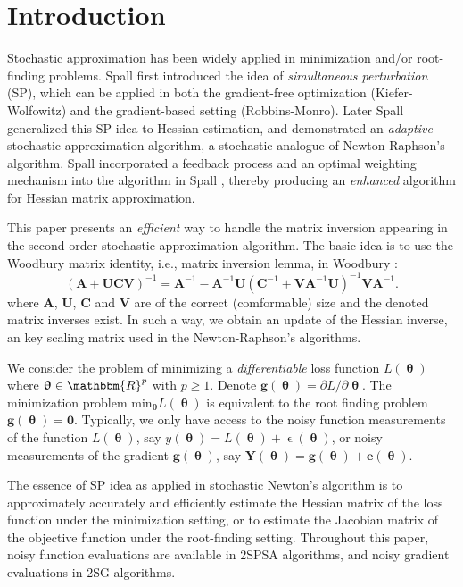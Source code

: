 \documentclass[conference]{IEEEtran}
\begin{document}
	\section{Introduction} \label{Introduction}
	Stochastic approximation has been widely applied in minimization and/or root-finding problems. Spall \cite{Spall1992} first introduced the idea of \textit{simultaneous perturbation} (SP), which can be applied in both the gradient-free optimization (Kiefer-Wolfowitz) and the gradient-based setting (Robbins-Monro). Later Spall \cite{Spall2000} generalized this SP idea to Hessian estimation, and demonstrated an \textit{adaptive} stochastic approximation algorithm, a stochastic analogue of Newton-Raphson's algorithm. Spall \cite{Spall2009} incorporated a feedback process and an optimal weighting mechanism into the algorithm in Spall \cite{Spall2000}, thereby producing an \textit{enhanced} algorithm for Hessian matrix approximation. 
	
	This paper presents an \textit{efficient} way to handle the matrix inversion appearing in the second-order stochastic approximation algorithm. The basic idea is to use the Woodbury matrix identity, i.e., matrix inversion lemma, in Woodbury \cite{Woodbury1950}:
	\begin{equation} \label{eq:MatrixInversion}
		(\bm{A}+\bm{UCV})^{-1}=\bm{A}^{-1}-\bm{A}^{-1}\bm{U}(\bm{C}^{-1}+\bm{V}\bm{A}^{-1}\bm{U})^{-1}\bm{V}\bm{A}^{-1}.
	\end{equation}
	where $\bm{A}$, $\bm{U}$, $\bm{C}$ and $\bm{V}$ are of the correct (comformable) size and the denoted matrix inverses exist. In such a way, we obtain an update of the Hessian inverse, an key scaling matrix used in the Newton-Raphson's algorithms.
	
	We consider the problem of minimizing a \textit{differentiable} loss function $ L(\bm{\uptheta}) $ where $ \bm{\uptheta} \in \mathbbm{R}^p $ with $ p\ge1 $. Denote $\bm{g}(\bm{\uptheta})={\partial L}/{\partial \bm{\uptheta}}$. The minimization problem ${\text{min}}_{\bm{\uptheta}}L(\bm{\uptheta})$ is equivalent to the root finding problem $\bm{g}(\bm{\uptheta})=\bm{0}$.  Typically, we only have access to the noisy function measurements of the function $ L(\bm{\uptheta}) $, say $ y(\bm{\uptheta})=L(\bm{\uptheta})+\upvarepsilon(\bm{\uptheta}) $, or noisy measurements of the gradient $\bm{g}(\bm{\uptheta})$, say $\bm{Y}(\bm{\uptheta})=\bm{g}(\bm{\uptheta})+\bm{e}(\bm{\uptheta})$.
	
	The essence of SP idea as applied in stochastic Newton's algorithm is to approximately accurately and efficiently estimate the Hessian matrix of the loss function under the minimization setting, or to estimate the Jacobian matrix of the objective function under the root-finding setting. Throughout this paper, noisy function evaluations are available in 2SPSA algorithms, and noisy gradient evaluations in 2SG algorithms.
	
\end{document}
